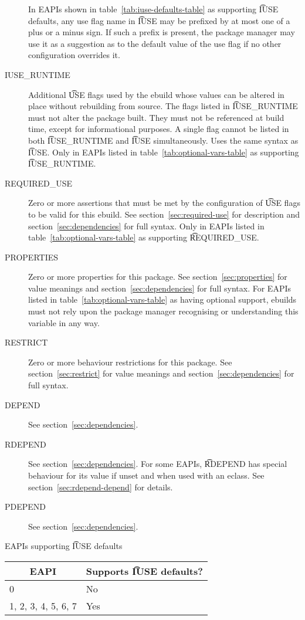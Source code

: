 \begin{description}
     In EAPIs shown in table~\ref{tab:iuse-defaults-table} as supporting
    \t{IUSE} defaults, any use flag name in \t{IUSE} may be prefixed by at most one of a plus or a
    minus sign. If such a prefix is present, the package manager may use it as a suggestion as to
    the default value of the use flag if no other configuration overrides it.
\item[IUSE_RUNTIME]  Additional \t{USE} flags used by the ebuild whose
    values can be altered in place without rebuilding from source. The flags listed in
    \t{IUSE_RUNTIME} must not alter the package built. They must not be referenced at build time,
    except for informational purposes. A single flag cannot be listed in both \t{IUSE_RUNTIME}
    and \t{IUSE} simultaneously. Uses the same syntax as \t{IUSE}\@. Only in EAPIs listed
    in table~\ref{tab:optional-vars-table} as supporting \t{IUSE_RUNTIME}.
\item[REQUIRED_USE]  Zero or more assertions that must be met by the
    configuration of \t{USE} flags to be valid for this ebuild. See section~\ref{sec:required-use}
    for description and section~\ref{sec:dependencies} for full syntax. Only in EAPIs listed in
    table~\ref{tab:optional-vars-table} as supporting \t{REQUIRED_USE}.
\item[PROPERTIES]  Zero or more properties for this package.
    See section~\ref{sec:properties} for value meanings and section~\ref{sec:dependencies} for full
    syntax. For EAPIs listed in table~\ref{tab:optional-vars-table} as having optional support,
    ebuilds must not rely upon the package manager recognising or understanding this variable in
    any way.
\item[RESTRICT] Zero or more behaviour restrictions for this package. See section~\ref{sec:restrict}
    for value meanings and section~\ref{sec:dependencies} for full syntax.
\item[DEPEND] See section~\ref{sec:dependencies}.
\item[RDEPEND] See section~\ref{sec:dependencies}. For some EAPIs, \t{RDEPEND} has special behaviour
    for its value if unset and when used with an eclass. See section~\ref{sec:rdepend-depend} for
    details.
\item[PDEPEND] See section~\ref{sec:dependencies}.
\end{description}

\begin{centertable}{EAPIs supporting \t{IUSE} defaults}
    \label{tab:iuse-defaults-table}
    \begin{tabular}{ll}
      \toprule
      \multicolumn{1}{c}{\textbf{EAPI}} &
      \multicolumn{1}{c}{\textbf{Supports \t{IUSE} defaults?}} \\
      \midrule
      0                         & No  \\
      1, 2, 3, 4, 5, 6, 7       & Yes \\
      \bottomrule
    \end{tabular}
\end{centertable}


